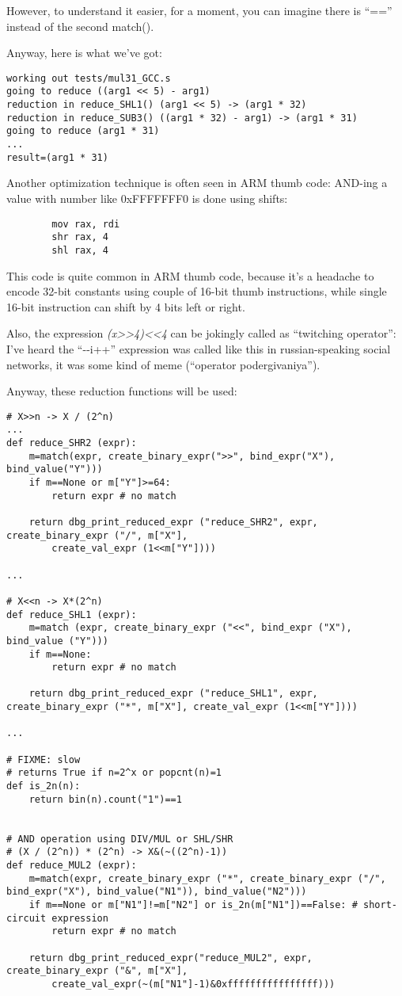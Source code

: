 ﻿\documentclass[12pt]{article}
\begin{document}
However, to understand it easier, for a moment, you can imagine there is ``=='' instead of the second match().

Anyway, here is what we've got:

\begin{lstlisting}
working out tests/mul31_GCC.s
going to reduce ((arg1 << 5) - arg1)
reduction in reduce_SHL1() (arg1 << 5) -> (arg1 * 32)
reduction in reduce_SUB3() ((arg1 * 32) - arg1) -> (arg1 * 31)
going to reduce (arg1 * 31)
...
result=(arg1 * 31)
\end{lstlisting}

Another optimization technique is often seen in ARM thumb code: AND-ing a value with number like 0xFFFFFFF0
is done using shifts:

\begin{lstlisting}
        mov rax, rdi
        shr rax, 4
        shl rax, 4
\end{lstlisting}

This code is quite common in ARM thumb code, because it's a headache to encode 32-bit constants using couple of 16-bit
thumb instructions, while single 16-bit instruction can shift by 4 bits left or right.

Also, the expression \textit{(x>>4)<<4} can be jokingly called as ``twitching operator'':
I've heard the ``-{}-i++'' expression was called like this in russian-speaking social networks, it was some kind of meme
(``operator podergivaniya'').

Anyway, these reduction functions will be used:

\begin{lstlisting}
# X>>n -> X / (2^n)
...
def reduce_SHR2 (expr):
    m=match(expr, create_binary_expr(">>", bind_expr("X"), bind_value("Y")))
    if m==None or m["Y"]>=64:
        return expr # no match

    return dbg_print_reduced_expr ("reduce_SHR2", expr, create_binary_expr ("/", m["X"],
        create_val_expr (1<<m["Y"])))

...

# X<<n -> X*(2^n)
def reduce_SHL1 (expr):
    m=match (expr, create_binary_expr ("<<", bind_expr ("X"), bind_value ("Y")))
    if m==None:
        return expr # no match
    
    return dbg_print_reduced_expr ("reduce_SHL1", expr, create_binary_expr ("*", m["X"], create_val_expr (1<<m["Y"])))

...

# FIXME: slow
# returns True if n=2^x or popcnt(n)=1
def is_2n(n):
    return bin(n).count("1")==1


# AND operation using DIV/MUL or SHL/SHR
# (X / (2^n)) * (2^n) -> X&(~((2^n)-1))
def reduce_MUL2 (expr):
    m=match(expr, create_binary_expr ("*", create_binary_expr ("/", bind_expr("X"), bind_value("N1")), bind_value("N2")))
    if m==None or m["N1"]!=m["N2"] or is_2n(m["N1"])==False: # short-circuit expression
        return expr # no match

    return dbg_print_reduced_expr("reduce_MUL2", expr, create_binary_expr ("&", m["X"],
        create_val_expr(~(m["N1"]-1)&0xffffffffffffffff)))
\end{lstlisting}
\end{document}
